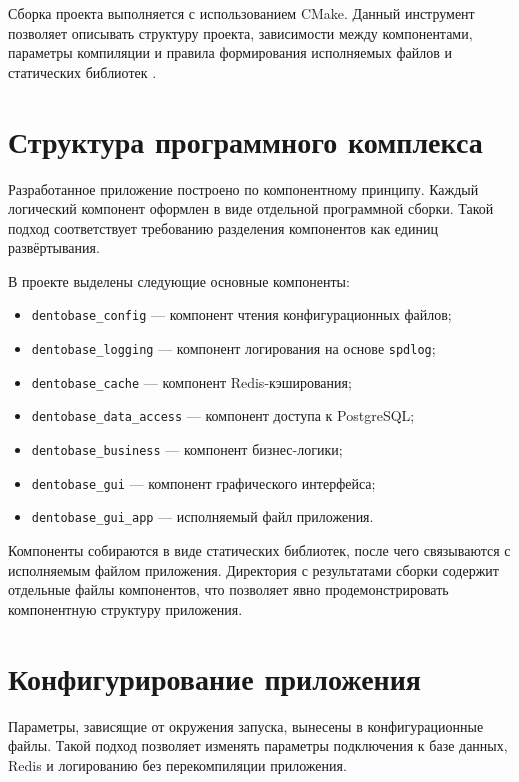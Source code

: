 Сборка проекта выполняется с использованием CMake. Данный инструмент позволяет описывать структуру проекта, зависимости между компонентами, параметры компиляции и правила формирования исполняемых файлов и статических библиотек \cite{cmake_docs}.

\section{Структура программного комплекса}

Разработанное приложение построено по компонентному принципу. Каждый логический компонент оформлен в виде отдельной программной сборки. Такой подход соответствует требованию разделения компонентов как единиц развёртывания.

В проекте выделены следующие основные компоненты:

\begin{itemize}
	\item \texttt{dentobase\_config} --- компонент чтения конфигурационных файлов;
	\item \texttt{dentobase\_logging} --- компонент логирования на основе \texttt{spdlog};
	\item \texttt{dentobase\_cache} --- компонент Redis-кэширования;
	\item \texttt{dentobase\_data\_access} --- компонент доступа к PostgreSQL;
	\item \texttt{dentobase\_business} --- компонент бизнес-логики;
	\item \texttt{dentobase\_gui} --- компонент графического интерфейса;
	\item \texttt{dentobase\_gui\_app} --- исполняемый файл приложения.
\end{itemize}

Компоненты собираются в виде статических библиотек, после чего связываются с исполняемым файлом приложения. Директория с результатами сборки содержит отдельные файлы компонентов, что позволяет явно продемонстрировать компонентную структуру приложения.

\section{Конфигурирование приложения}

Параметры, зависящие от окружения запуска, вынесены в конфигурационные файлы. Такой подход позволяет изменять параметры подключения к базе данных, Redis и логированию без перекомпиляции приложения.

